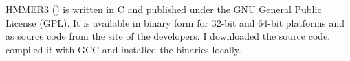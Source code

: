 HMMER3 (\cite{eddy2011}) is written in C and published under the GNU General
Public License (GPL). It is available in binary form for 32-bit and 64-bit
platforms and as source code from the site of the developers.  I downloaded the
source code, compiled it with GCC and installed the binaries locally. 
